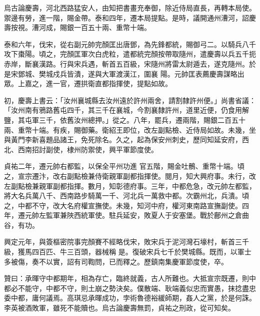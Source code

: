 \begin{pinyinscope}
 烏古論慶壽，河北西路猛安人，由知把書畫充奉御，除近侍局直長，再轉本局使。禦邊有勞，進一階，賜金帶。泰和四年，遷本局提點。是時，議開通州漕河，詔慶壽按視。漕河成，賜銀一百五十兩、重幣十端。



 泰和六年，伐宋，從右副元帥完顏匡出唐鄧，為先鋒都統，賜御弓二。以騎兵八千攻下棗陽。頃之，完顏匡軍次白虎粒，遣都統完顏按帶取隨州，遣慶壽以兵五千扼赤岸，斷襄漢路。行與宋兵遇，斬首五百級，宋隨州將雷太尉遁去，遂克隨州。於是宋鄧城、樊城戍兵皆潰，遂與大軍渡漢江，圍襄
 陽。元帥匡表薦慶壽謀略出眾。上嘉之，進一官，遷拱衛直都指揮使，提點如故。



 初，慶壽上書云：「汝州襄城縣去汝州遠於許州兩舍，請割隸許州便。」尚書省議：「汝州南有鴉路舊屯四千，其三千在襄城，今割襄隸許州，道里近便，仍食用解鹽，其屯軍三千，依舊汝州總押。」從之。八年，罷兵，遷兩階，賜銀二百五十兩、重幣十端。有疾，賜御藥。衛紹王即位，改左副點檢、近侍局如故。未幾，坐與黃門李新喜題品諸王，免死除名。久之，起為保安州刺史，歷同知延安府，西北、西南招討副使，棣州防禦使，興平軍節度使。



 貞祐二年，遷元帥右都監，以保全平州功進
 官五階，賜金吐鶻、重幣十端。頃之，宣宗遷汴，改右副點檢兼侍衛親軍副都指揮使。閱月，知大興府事。未行，改左副點檢兼親軍副都指揮。數月，知彰德府事。三年，中都危急，改元帥左都監，將大名兵萬八千、西南路步騎萬一千、河北兵一萬救中都。次霸州北，兵潰。頃之，中都不守，改大名府權宣撫使。未幾，知河中府，權河東南路宣撫副使。四年，遷元帥左監軍兼陜西統軍使。駐兵延安，敗夏人于安塞堡。戰於鄜州之倉曲谷，有功。



 興定元年，與簽樞密院事完顏賽不經略伐宋，敗宋兵于泥河灣石壕村，斬首三千級，獲馬四百匹、牛三百頭，器械稱
 是。復破宋兵七千於樊城縣。既而，以軍士多被傷，奏不以實，詔有司鞫問，已而釋之。歷鎮南集慶軍節度使，卒。



 贊曰：承暉守中都期年，相為存亡，臨終就義，古人所難也。大抵宣宗既遷，則中都必不能守，中都不守，則土崩之勢決矣。僕散端、耿端義似忠而實愚，抹捻盡忠委中都，庸何議焉。高琪忌承暉成功，孛術魯德裕緩師期，姦人之黨，於是何誅。李英被酒敗軍，雖死不能贖也。烏古論慶壽無罰，貞祐之刑政，從可知矣。



\end{pinyinscope}